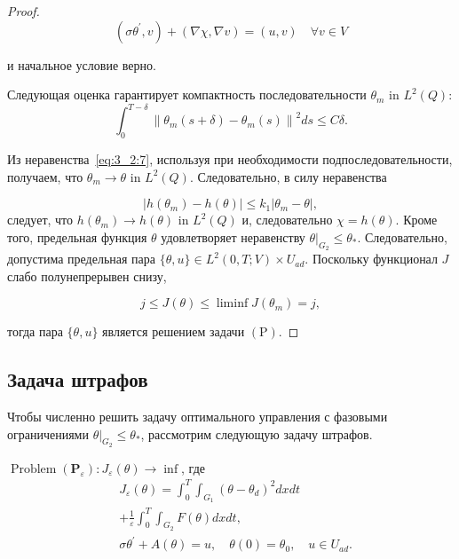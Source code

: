 \begin{proof}
    \[ \left(\sigma \theta^{\prime}, v\right)+(\nabla \chi, \nabla v)=(u, v) \quad \forall v \in V \]

    и начальное условие верно.

    Следующая оценка гарантирует компактность последовательности $\theta_{m}$ in $L^{2}(Q)$:
    \begin{equation}
        \label{eq:3_2:7}
        \int_{0}^{T-\delta}\left\|\theta_{m}(s+\delta)-\theta_{m}(s)\right\|^{2} d s \leq C \delta.
    \end{equation}

    Из неравенства~\eqref{eq:3_2:7}, используя при необходимости подпоследовательности,
    получаем, что $\theta_{m} \rightarrow \theta$ in $L^{2}(Q)$.
    Следовательно, в силу неравенства

    \[ \left|h\left(\theta_{m}\right)-h(\theta)\right|
    \leq k_{1}\left|\theta_{m}-\theta\right|, \]
    следует, что $h\left(\theta_{m}\right) \rightarrow h(\theta)$ in $L^{2}(Q)$
    и, следовательно $\chi=h(\theta)$.
    Кроме того, предельная функция $\theta$ удовлетворяет неравенству
    $\left.\theta\right|_{G_{2}} \leq \theta_{*}$.
    Следовательно, допустима предельная пара
    $\{\theta, u\} \in L^{2}(0, T ; V) \times U_{a d}$.
    Поскольку функционал $J$ слабо полунепрерывен снизу,

    \[ j \leq J(\theta) \leq \liminf J\left(\theta_{m}\right)=j, \]

    тогда пара $\{\theta, u\}$ является решением задачи $(\mathrm{P})$.
\end{proof}

\subsection{Задача штрафов}
\label{subsec:ch3/sec2/penalty}
Чтобы численно решить задачу оптимального управления с фазовыми ограничениями
$\left.\theta\right|_{G_{2}} \leq \theta_{*}$, рассмотрим следующую задачу штрафов.

$\operatorname{Problem}\left(\mathbf{P}_{\varepsilon}\right):
J_{\varepsilon}(\theta) \rightarrow \inf$,
где
\[
    \begin{aligned}
        & J_{\varepsilon}(\theta)=\int_{0}^{T}
        \int_{G_{1}}\left(\theta-\theta_{d}\right)^{2} d x d t \\
        & +\frac{1}{\varepsilon} \int_{0}^{T}
        \int_{G_{2}} F(\theta) d x d t, \\
        & \sigma \theta^{\prime}+A(\theta)=u,
        \quad \theta(0)=\theta_{0}, \quad u \in U_{a d}.
    \end{aligned}
\]


